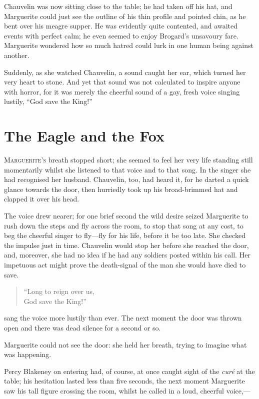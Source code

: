\documentclass[paper=a5,BCOR=7mm,twoside,DIV=calc,12pt,usegeometry,chapterprefix,endperiod,headings=big]{scrbook}
\begin{document}
Chauvelin was now sitting close to the table; he had taken off his hat, and Marguerite could just see the outline of his thin profile and pointed chin, as he bent over his meagre supper. He was evidently quite contented, and awaited events with perfect calm; he even seemed to enjoy Brogard's unsavoury fare. Marguerite wondered how so much hatred could lurk in one human being against another.

Suddenly, as she watched Chauvelin, a sound caught her ear, which turned her very heart to stone. And yet that sound was not calculated to inspire anyone with horror, for it was merely the cheerful sound of a gay, fresh voice singing lustily, \enquote{God save the King!}

\chapter{The Eagle and the Fox}
\lettrine[lines=4]{M}{arguerite's} breath stopped short; she seemed to feel her very life standing still momentarily whilst she listened to that voice and to that song. In the singer she had recognised her husband. Chauvelin, too, had heard it, for he darted a quick glance towards the door, then hurriedly took up his broad-brimmed hat and clapped it over his head.

The voice drew nearer; for one brief second the wild desire seized Marguerite to rush down the steps and fly across the room, to stop that song at any cost, to beg the cheerful singer to fly---fly for his life, before it be too late. She checked the impulse just in time. Chauvelin would stop her before she reached the door, and, moreover, she had no idea if he had any soldiers posted within his call. Her impetuous act might prove the death-signal of the man she would have died to save.

\blockquote{
\enquote{Long to reign over us,\\
God save the King!}
}

sang the voice more lustily than ever. The next moment the door was thrown open and there was dead silence for a second or so.

Marguerite could not see the door: she held her breath, trying to imagine what was happening.

Percy Blakeney on entering had, of course, at once caught sight of the \textit{curé} at the table; his hesitation lasted less than five seconds, the next moment Marguerite saw his tall figure crossing the room, whilst he called in a loud, cheerful voice,---
\end{document}
